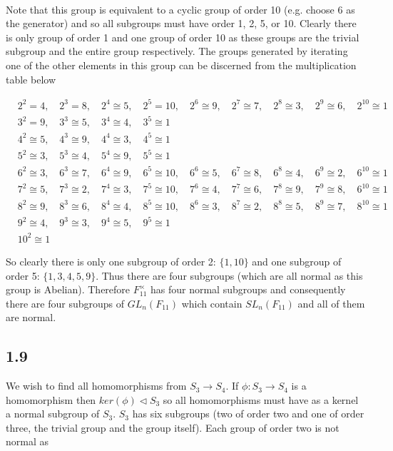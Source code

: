 \documentclass{article}
\begin{document}
\paragraph{}
Note that this group is equivalent to a cyclic group of order 10 (e.g. choose $6$ as the generator) 
and so all subgroups must have order 1, 2, 5, or 10. Clearly there is only group of order 1 and 
one group of order 10 as these groups are the trivial subgroup and the entire group respectively. 
The groups generated by iterating one of the other elements in this group can be discerned from the 
multiplication table below

\begin{align*}
	&2^2 = 4, \quad 2^3 = 8, \quad 2^4 \cong 5, \quad 2^5 = 10, \quad 2^6 \cong 9, \quad 2^7 \cong 7, \quad 2^8 \cong 3, \quad 2^9 \cong 6, \quad 2^{10} \cong 1 \\
	&3^2 = 9, \quad 3^3 \cong 5, \quad 3^4 \cong 4, \quad 3^5 \cong 1 \\
	&4^2 \cong 5, \quad 4^3 \cong 9, \quad 4^4 \cong 3, \quad 4^5 \cong 1 \\
	&5^2 \cong 3, \quad 5^3 \cong 4, \quad 5^4 \cong 9, \quad 5^5 \cong 1 \\
	&6^2 \cong 3, \quad 6^3 \cong 7, \quad 6^4 \cong 9, \quad 6^5 \cong 10, \quad 6^6 \cong 5, \quad 6^7 \cong 8, \quad 6^8 \cong 4, \quad 6^9 \cong 2, \quad 6^{10} \cong 1 \\
	&7^2 \cong 5, \quad 7^3 \cong 2, \quad 7^4 \cong 3, \quad 7^5 \cong 10, \quad 7^6 \cong 4, \quad 7^7 \cong 6, \quad 7^8 \cong 9, \quad 7^9 \cong 8, \quad 6^{10} \cong 1 \\
	&8^2 \cong 9, \quad 8^3 \cong 6, \quad 8^4 \cong 4, \quad 8^5 \cong 10, \quad 8^6 \cong 3, \quad 8^7 \cong 2, \quad 8^8 \cong 5, \quad 8^9 \cong 7, \quad 8^{10} \cong 1 \\
	&9^2 \cong 4, \quad 9^3 \cong 3, \quad 9^4 \cong 5, \quad 9^5 \cong 1 \\
	&10^2 \cong 1
\end{align*}

So clearly there is only one subgroup of order 2: $\{1, 10\}$ and one subgroup of order 5: $\{1,3,4,5,9\}$. 
Thus there are four subgroups (which are all normal as this group is Abelian). Therefore 
$F_{11}^\times$ has four normal subgroups and consequently there are four subgroups of $GL_n(F_{11})$ 
which contain $SL_n(F_{11})$ and all of them are normal.

\subsection*{1.9}
We wish to find all homomorphisms from $S_3 \rightarrow S_4$. If $\phi:S_3 \rightarrow S_4$ is 
a homomorphism then $ker(\phi) \triangleleft S_3$ so all homomorphisms must have as a kernel 
a normal subgroup of $S_3$. $S_3$ has six subgroups (two of order two and one of order 
three, the trivial group and the group itself). Each group of order two is not normal as 
\end{document}
